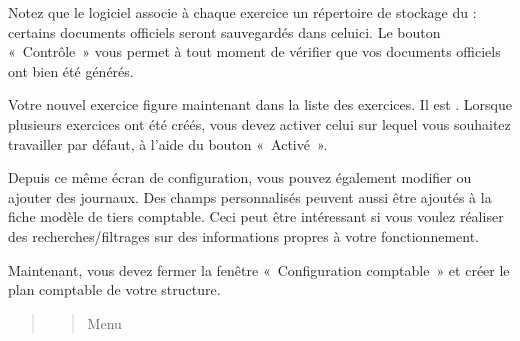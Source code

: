 \documentclass[a4paper,10pt,oneside,french]{sphinxmanual}
\begin{document}
Notez que le logiciel associe à chaque exercice un répertoire de stockage du  : certains documents
officiels seront sauvegardés dans celui\sphinxhyphen{}ci. Le bouton « Contrôle » vous permet à tout moment de  vérifier que vos documents officiels ont bien été générés.

Votre nouvel exercice figure maintenant dans la liste des exercices. Il est \sphinxstylestrong{{[}en création{]}}. Lorsque plusieurs exercices ont été créés, vous devez activer celui sur lequel vous souhaitez travailler par défaut, à l’aide du bouton « Activé ».
\begin{quote}

\end{quote}

Depuis ce même écran de configuration, vous pouvez également modifier ou ajouter des journaux. Des champs personnalisés peuvent aussi être ajoutés à la fiche modèle de tiers comptable. Ceci peut être intéressant si vous voulez réaliser des recherches/filtrages sur des informations propres à votre fonctionnement.

Maintenant, vous devez fermer la fenêtre « Configuration comptable » et créer le plan comptable de votre structure.
\begin{quote}
\begin{quote}

Menu 
\end{quote}
\end{quote}
\end{document}
